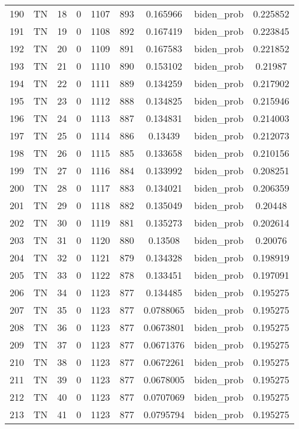 \documentclass[12pt,a4paper]{article}
\begin{document}
\begin{tabular}{r|cccccccc}
	190 & TN & 18 & 0 & 1107 & 893 & 0.165966 & biden\_prob & 0.225852 \\
	191 & TN & 19 & 0 & 1108 & 892 & 0.167419 & biden\_prob & 0.223845 \\
	192 & TN & 20 & 0 & 1109 & 891 & 0.167583 & biden\_prob & 0.221852 \\
	193 & TN & 21 & 0 & 1110 & 890 & 0.153102 & biden\_prob & 0.21987 \\
	194 & TN & 22 & 0 & 1111 & 889 & 0.134259 & biden\_prob & 0.217902 \\
	195 & TN & 23 & 0 & 1112 & 888 & 0.134825 & biden\_prob & 0.215946 \\
	196 & TN & 24 & 0 & 1113 & 887 & 0.134831 & biden\_prob & 0.214003 \\
	197 & TN & 25 & 0 & 1114 & 886 & 0.13439 & biden\_prob & 0.212073 \\
	198 & TN & 26 & 0 & 1115 & 885 & 0.133658 & biden\_prob & 0.210156 \\
	199 & TN & 27 & 0 & 1116 & 884 & 0.133992 & biden\_prob & 0.208251 \\
	200 & TN & 28 & 0 & 1117 & 883 & 0.134021 & biden\_prob & 0.206359 \\
	201 & TN & 29 & 0 & 1118 & 882 & 0.135049 & biden\_prob & 0.20448 \\
	202 & TN & 30 & 0 & 1119 & 881 & 0.135273 & biden\_prob & 0.202614 \\
	203 & TN & 31 & 0 & 1120 & 880 & 0.13508 & biden\_prob & 0.20076 \\
	204 & TN & 32 & 0 & 1121 & 879 & 0.134328 & biden\_prob & 0.198919 \\
	205 & TN & 33 & 0 & 1122 & 878 & 0.133451 & biden\_prob & 0.197091 \\
	206 & TN & 34 & 0 & 1123 & 877 & 0.134485 & biden\_prob & 0.195275 \\
	207 & TN & 35 & 0 & 1123 & 877 & 0.0788065 & biden\_prob & 0.195275 \\
	208 & TN & 36 & 0 & 1123 & 877 & 0.0673801 & biden\_prob & 0.195275 \\
	209 & TN & 37 & 0 & 1123 & 877 & 0.0671376 & biden\_prob & 0.195275 \\
	210 & TN & 38 & 0 & 1123 & 877 & 0.0672261 & biden\_prob & 0.195275 \\
	211 & TN & 39 & 0 & 1123 & 877 & 0.0678005 & biden\_prob & 0.195275 \\
	212 & TN & 40 & 0 & 1123 & 877 & 0.0707069 & biden\_prob & 0.195275 \\
	213 & TN & 41 & 0 & 1123 & 877 & 0.0795794 & biden\_prob & 0.195275 \\

\end{tabular}
\end{document}
